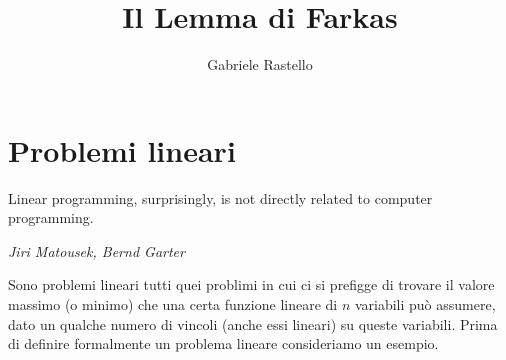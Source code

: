 \documentclass[italian, letter paper, 12pt, reqno]{article}
\theoremstyle{myteo}
\numberwithin{equation}{section}
\begin{document}
\title{Il Lemma di Farkas}
\author{Gabriele Rastello}
\maketitle
\tableofcontents

\section{Problemi lineari}
\label{sec:problemi_lineari}
\epigraph{Linear programming, surprisingly, is not directly related to computer programming.}{\textit{Jiri Matousek, Bernd Garter}}
Sono problemi lineari tutti quei problimi in cui ci si prefigge di trovare il valore massimo (o minimo) che una certa funzione lineare di \(n\) variabili può assumere, dato un qualche numero di vincoli (anche essi lineari) su queste variabili.
Prima di definire formalmente un problema lineare consideriamo un esempio.
\end{document}
